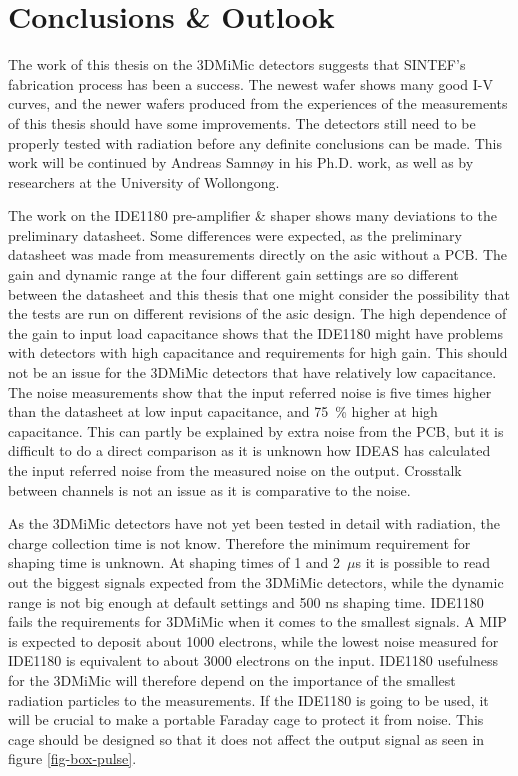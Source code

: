 \documentclass[../main/thesis.tex]{subfiles}
\begin{document}
\newchapter

\chapter*{Conclusions \& Outlook}
\label{conc}

The work of this thesis on the 3DMiMic detectors suggests that SINTEF's fabrication process has been a success. The newest wafer shows many good I-V curves, and the newer wafers produced from the experiences of the measurements of this thesis should have some improvements. The detectors still need to be properly tested with radiation before any definite conclusions can be made. This work will be continued by Andreas Samnøy in his Ph.D. work, as well as by researchers at the University of Wollongong. 

The work on the IDE1180 pre-amplifier \& shaper shows many deviations to the preliminary datasheet. Some differences were expected, as the preliminary datasheet was made from measurements directly on the \gls{asic} without a \gls{PCB}. The gain and dynamic range at the four different gain settings are so different between the datasheet and this thesis that one might consider the possibility that the tests are run on different revisions of the \gls{asic} design. The high dependence of the gain to input load capacitance shows that the IDE1180 might have problems with detectors with high capacitance and requirements for high gain. This should not be an issue for the 3DMiMic detectors that have relatively low capacitance. The noise measurements show that the input referred noise is five times higher than the datasheet at low input capacitance, and 75~\% higher at high capacitance. This can partly be explained by extra noise from the \gls{PCB}, but it is difficult to do a direct comparison as it is unknown how IDEAS has calculated the input referred noise from the measured noise on the output. Crosstalk between channels is not an issue as it is comparative to the noise.

As the 3DMiMic detectors have not yet been tested in detail with radiation, the charge collection time is not know. Therefore the minimum requirement for shaping time is unknown. At shaping times of 1 and 2~$\mu$s it is possible to read out the biggest signals expected from the 3DMiMic detectors, while the dynamic range is not big enough at default settings and 500 ns shaping time. IDE1180 fails the requirements for 3DMiMic when it comes to the smallest signals. A \acrlong{MIP} is expected to deposit about 1000 electrons, while the lowest noise measured for IDE1180 is equivalent to about 3000 electrons on the input. IDE1180 usefulness for the 3DMiMic will therefore depend on the importance of the smallest radiation particles to the measurements. If the IDE1180 is going to be used, it will be crucial to make a portable Faraday cage to protect it from noise. This cage should be designed so that it does not affect the output signal as seen in figure \ref{fig-box-pulse}. 
\end{document}
